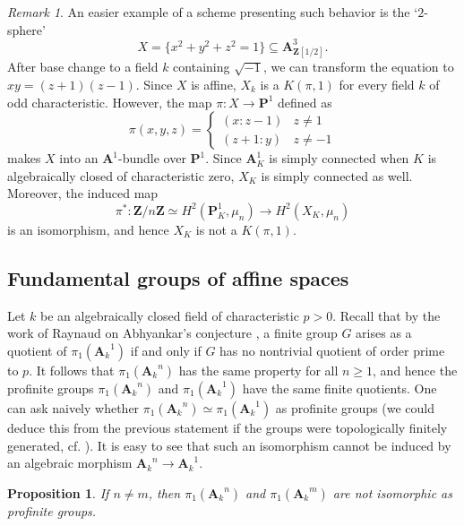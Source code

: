 \documentclass[twoside]{amsart}
\renewcommand{\AA}{\mathbf{A}}
\newcommand{\PP}{\mathbf{P}}
\newcommand{\ZZ}{\mathbf{Z}}
\newcommand{\ANK}[2]{{\AA_{#2}}^{\! \! \! \!  #1}} %
\newcommand{\AN}[1]{\ANK{#1}{k}}
\newcommand{\isom}{\simeq}
\renewcommand{\to}{\longrightarrow}
\theoremstyle{plain}
\newtheorem{proposition}[subsubsection]{Proposition}
\theoremstyle{definition}
\theoremstyle{remark}
\newtheorem{remark}[subsubsection]{Remark}
\numberwithin{equation}{subsection}
\begin{document}
\begin{remark}
An easier example of a scheme presenting such behavior is the `$2$-sphere'
\[ 
	X = \{ x^2 + y^2 + z^2 = 1 \} \subseteq \AA^{3}_{\ZZ[1/2]}.
\]
After base change to a field $k$ containing $\sqrt{-1}$, we can transform the equation to $xy = (z+1)(z-1)$. Since $X$ is affine, $X_k$ is a $K(\pi, 1)$ for every field $k$ of odd characteristic. However, the map $\pi\colon X \to \PP^1$ defined as
\[ 
	\pi(x,y,z) = \begin{cases}
		(x: z-1) & z\neq 1 \\
		(z+1 : y) & z\neq -1
	\end{cases}
\]
makes $X$ into an $\AA^1$-bundle over $\PP^1$. Since $\AA^1_K$ is simply connected when $K$ is algebraically closed of characteristic zero, $X_K$ is simply connected as well. Moreover, the induced map 
\[ 
	\pi^*\colon \ZZ/n\ZZ\isom H^2(\PP^1_{K}, \mu_n)\to H^2(X_{K}, \mu_n)
\]
is an isomorphism, and hence $X_K$ is not a $K(\pi, 1)$.
\end{remark}

\subsection{Fundamental groups of affine spaces} 
\label{ex:differentan}

Let $k$ be an algebraically closed field of characteristic $p>0$. Recall that by the work of Raynaud on Abhyankar's conjecture \cite{Raynaud}, a finite group $G$ arises as a quotient of $\pi_1(\AN{1})$ if and only if $G$ has no nontrivial quotient of order prime to $p$. It follows that $\pi_1(\AN{n})$ has the same property for all $n\geq 1$, and hence the profinite groups $\pi_1(\AN{n})$ and $\pi_1(\AN{1})$ have the same finite quotients. One can ask naively whether $\pi_1(\AN{n})\isom \pi_1(\AN{1})$ as profinite groups (we could deduce this from the previous statement if the groups were topologically finitely generated, cf. \cite[Proposition 15.4]{FriedJarden}). It is easy to see that such an isomorphism cannot be induced by an algebraic morphism $\AN{n}\to \AN{1}$. 

\begin{proposition}
	If $n\neq m$, then $\pi_1(\AN{n})$ and $\pi_1(\AN{m})$ are not isomorphic as profinite groups.
\end{proposition}
\end{document}
